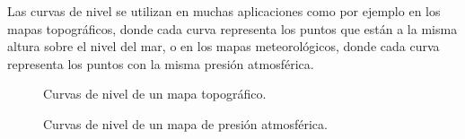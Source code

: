 \documentclass[
  a4paper,
]{scrreport}
\theoremstyle{plain}
\theoremstyle{plain}
\theoremstyle{definition}
\theoremstyle{definition}
\theoremstyle{plain}
\theoremstyle{definition}
\theoremstyle{remark}
\begin{document}
Las curvas de nivel se utilizan en muchas aplicaciones como por ejemplo
en los mapas topográficos, donde cada curva representa los puntos que
están a la misma altura sobre el nivel del mar, o en los mapas
meteorológicos, donde cada curva representa los puntos con la misma
presión atmosférica.

\begin{figure}

\begin{minipage}[t]{0.50\linewidth}

{\centering 


\caption{Curvas de nivel de un mapa topográfico.}

}

\end{minipage}%
%
\begin{minipage}[t]{0.50\linewidth}

{\centering 


\caption{Curvas de nivel de un mapa de presión atmosférica.}

}

\end{minipage}%

\end{figure}
\end{document}

